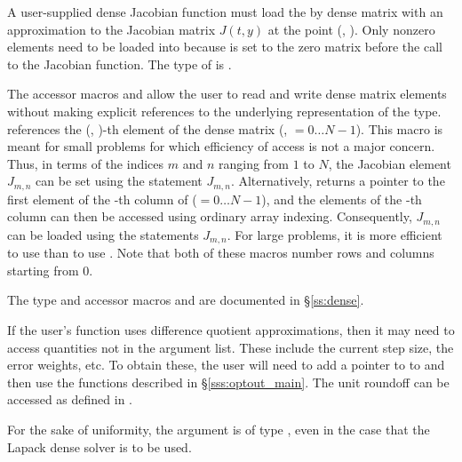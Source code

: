{
  A user-supplied dense Jacobian function must load the  by 
  dense matrix  with an approximation to the Jacobian matrix $J(t,y)$
  at the point (, ).  Only nonzero elements need to be loaded
  into  because  is set to the zero matrix before the call
  to the Jacobian function. The type of  is . 
  
  The accessor macros  and  allow the user to
  read and write dense matrix elements without making explicit
  references to the underlying representation of the 
  type.  references the (, )-th
  element of the dense matrix  (, $= 0\ldots N-1$). This macro
  is meant for small problems for which efficiency of access is not a major
  concern.  Thus, in terms of the indices $m$ and $n$ ranging from $1$ to
  $N$, the Jacobian element $J_{m,n}$ can be set using the statement
   $J_{m,n}$.  Alternatively,
   returns a pointer to the first element of
  the -th column of  ($= 0\ldots N-1$), and the 
  elements of the -th column
  can then be accessed using ordinary array indexing.  Consequently, $J_{m,n}$ can be 
  loaded using the statements 
   $J_{m,n}$.  For large problems, it is more 
  efficient to use  than to use . 
  Note that both of these macros number rows and columns
  starting from $0$.  

  The  type and accessor macros  and 
   are documented in \S\ref{ss:dense}.

  If the user's  function uses difference quotient
  approximations, then it may need to access quantities not in the argument
  list. These include the current step size, the error weights, etc.
  To obtain these, the user will need to add a pointer to  
  to  and then use the  functions described in
  \S\ref{sss:optout_main}. The unit roundoff can be accessed
  as  defined in .

  For the sake of uniformity, the argument  is of type ,
  even in the case that the Lapack dense solver is to be used.
}

